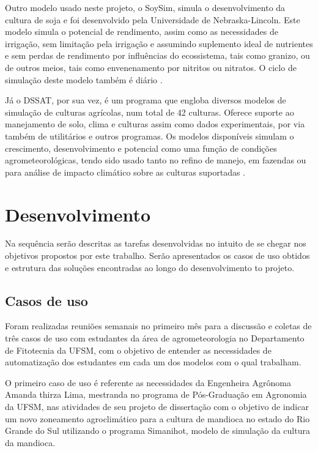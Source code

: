 \documentclass[12pt]{article}
\begin{document}
	Outro modelo usado neste projeto, o SoySim, simula o desenvolvimento da cultura de soja e foi desenvolvido pela Universidade de Nebraska-Lincoln. Este modelo simula o potencial de rendimento, assim como as necessidades de irrigação, sem limitação pela irrigação e assumindo suplemento ideal de nutrientes e sem perdas de rendimento por influências do ecossistema, tais como granizo, ou de outros meios, tais como envenenamento por nitritos ou nitratos. O ciclo de simulação deste modelo também é diário \cite{SoySim}.
	
	Já o DSSAT, por sua vez, é um programa que engloba diversos modelos de simulação de culturas agrícolas, num total de 42 culturas. Oferece suporte ao manejamento de solo, clima e culturas assim como dados experimentais, por via também de utilitários e outros programas. Os modelos disponíveis simulam o crescimento, desenvolvimento e potencial como uma função de condições agrometeorológicas, tendo sido usado tanto no refino de manejo, em fazendas ou para análise de impacto climático sobre as culturas suportadas \cite{dssat}.
	

	\section{Desenvolvimento}

	Na sequência serão descritas as tarefas desenvolvidas no intuito de se chegar nos objetivos propostos por este trabalho. Serão apresentados os casos de uso obtidos e estrutura das soluções encontradas ao longo do desenvolvimento to projeto.
	
	\subsection {Casos de uso}
	
	Foram realizadas reuniões semanais no primeiro mês para a discussão e coletas de três casos de uso com estudantes da área de agrometeorologia no Departamento de Fitotecnia da UFSM, com o objetivo de entender as necessidades de automatização dos estudantes em cada um dos modelos com o qual trabalham. 
	
	O primeiro caso de uso é referente as necessidades da Engenheira Agrônoma Amanda thirza Lima, mestranda no programa de Pós-Graduação em Agronomia da UFSM, nas atividades de seu projeto de dissertação com o objetivo de indicar um novo zoneamento agroclimático para a cultura de mandioca no estado do Rio Grande do Sul utilizando o programa Simanihot, modelo de simulação da cultura da mandioca.
	
\end{document}
